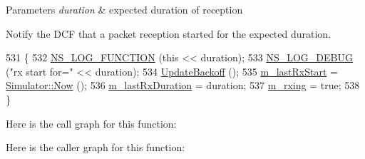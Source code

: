 \begin{DoxyParams}{Parameters}
{\em duration} & expected duration of reception\\
\hline
\end{DoxyParams}
Notify the D\+CF that a packet reception started for the expected duration. 
\begin{DoxyCode}
531 \{
532   \hyperlink{log-macros-disabled_8h_a90b90d5bad1f39cb1b64923ea94c0761}{NS\_LOG\_FUNCTION} (\textcolor{keyword}{this} << duration);
533   \hyperlink{group__logging_ga413f1886406d49f59a6a0a89b77b4d0a}{NS\_LOG\_DEBUG} (\textcolor{stringliteral}{"rx start for="} << duration);
534   \hyperlink{classns3_1_1DcfManager_a8fb01b9608eeab857a38935045fd98b8}{UpdateBackoff} ();
535   \hyperlink{classns3_1_1DcfManager_ab89f6e56efb993905d97ba7e28f6cc36}{m\_lastRxStart} = \hyperlink{classns3_1_1Simulator_ac3178fa975b419f7875e7105be122800}{Simulator::Now} ();
536   \hyperlink{classns3_1_1DcfManager_ab43fe243e604d9b329ccffdfbbba6499}{m\_lastRxDuration} = duration;
537   \hyperlink{classns3_1_1DcfManager_a4826eeefd00a05de3377987c4ce71969}{m\_rxing} = \textcolor{keyword}{true};
538 \}
\end{DoxyCode}


Here is the call graph for this function\+:




Here is the caller graph for this function\+:


